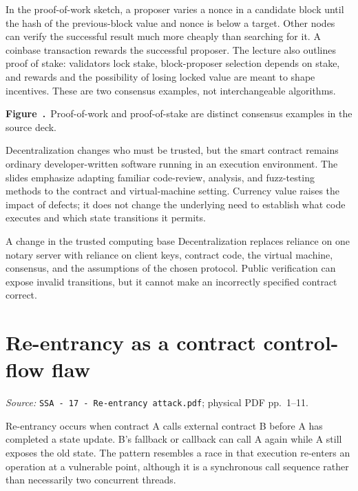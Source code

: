 \documentclass[11pt,a4paper]{article}
\newcommand{\currentmodule}{Contents}
\newcommand{\source}[2]{\textcolor{muted}{\small\textit{Source:} \nolinkurl{#1}; physical PDF pp.~#2.}\par\medskip}
\newcommand{\module}[2]{\par\Needspace{8\baselineskip}\gdef\currentmodule{#1}\section{#1}\label{#2}}
\numberwithin{figure}{section}
\newcommand{\diagramcaption}[1]{\par\smallskip\refstepcounter{figure}\begin{center}\small\textbf{Figure~\thefigure.}~#1\end{center}}
\begin{document}
In the proof-of-work sketch, a proposer varies a nonce in a candidate block until the hash of the previous-block value and nonce is below a target. Other nodes can verify the successful result much more cheaply than searching for it. A coinbase transaction rewards the successful proposer. The lecture also outlines proof of stake: validators lock stake, block-proposer selection depends on stake, and rewards and the possibility of losing locked value are meant to shape incentives. These are two consensus examples, not interchangeable algorithms.

\begin{center}\end{center}
\diagramcaption{Proof-of-work and proof-of-stake are distinct consensus examples in the source deck.}
Decentralization changes who must be trusted, but the smart contract remains ordinary developer-written software running in an execution environment. The slides emphasize adapting familiar code-review, analysis, and fuzz-testing methods to the contract and virtual-machine setting. Currency value raises the impact of defects; it does not change the underlying need to establish what code executes and which state transitions it permits.

\begin{concept}{A change in the trusted computing base}
Decentralization replaces reliance on one notary server with reliance on client keys, contract code, the virtual machine, consensus, and the assumptions of the chosen protocol. Public verification can expose invalid transitions, but it cannot make an incorrectly specified contract correct.
\end{concept}

\module{Re-entrancy as a contract control-flow flaw}{sec:reentrancy}
\source{SSA - 17 - Re-entrancy attack.pdf}{1--11}
Re-entrancy occurs when contract A calls external contract B before A has completed a state update. B's fallback or callback can call A again while A still exposes the old state. The pattern resembles a race in that execution re-enters an operation at a vulnerable point, although it is a synchronous call sequence rather than necessarily two concurrent threads.
\end{document}
